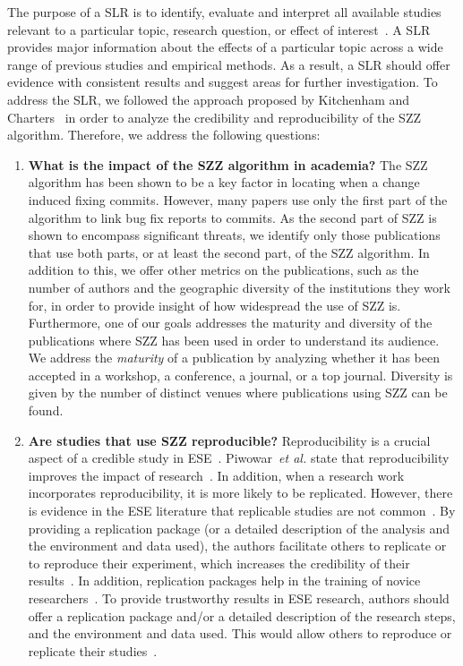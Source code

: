 \documentclass[a4paper, 12pt]{book}
\begin{document}
The purpose of a SLR is to identify, evaluate and interpret all available studies relevant to a particular topic, research question, or effect of interest~\cite{Kitchenham07guidelinesfor}. A SLR provides major information about the effects of a particular topic across a wide range of previous studies and empirical methods. As a result, a SLR should offer evidence with consistent results and suggest areas for further investigation. To address the SLR, we followed the approach proposed by Kitchenham and Charters~\cite{Kitchenham07guidelinesfor} in order to analyze the credibility and reproducibility of the SZZ algorithm. Therefore, we address the following  questions:
\begin{enumerate}
	\item \textbf{What is the impact of the SZZ algorithm in academia?} The SZZ algorithm has been shown to be a key factor in locating when a change induced fixing commits. However, many papers use only the first part of the algorithm to link bug fix reports to commits. As the second part of SZZ is shown to encompass significant threats, we identify only those publications that use both parts, or at least the second part, of the SZZ algorithm. In addition to this, we offer other metrics on the publications, such as the number of authors and the geographic diversity of the institutions they work for, in order to provide insight of how widespread the use of SZZ is.
	Furthermore, one of our goals addresses the maturity and diversity of the publications where SZZ has been used in order to understand its audience. We address the \emph{maturity} of a publication by analyzing whether it has been accepted in a workshop, a conference, a journal, or a top journal. Diversity is given by the number of distinct venues where publications using SZZ can be found.
	\item \textbf{Are studies that use SZZ reproducible?}  Reproducibility is a crucial aspect of a credible study in ESE~\cite{gonzalez2012reproducibility}. Piwowar~\emph{et al.} state that reproducibility improves the impact of research~\cite{piwowar2007sharing}. In addition, when a research work incorporates reproducibility, it is more likely to be replicated. However, there is evidence in the ESE literature that replicable studies are not common~\cite{robles2010replicating}. By providing a replication package (or a detailed description of the analysis and the environment and data used), the authors facilitate others to replicate or to reproduce their experiment, which increases the credibility of their results~\cite{juristo2009using}. In addition, replication packages help in the training of novice researchers~\cite{madeyski2017would}. To provide trustworthy results in ESE research, authors should offer a replication package and/or a detailed description of the research steps, and the environment and data used. This would allow others to reproduce or replicate their studies~\cite{gonzalez2012reproducibility}.

\end{enumerate}
\end{document}
